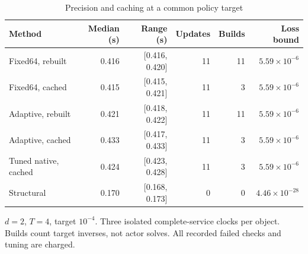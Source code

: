 \begin{table}[htbp]
\centering\small\setlength{\tabcolsep}{5pt}
\caption{Precision and caching at a common policy target}\label{tab:r39factorial}
\begin{tabular}{lrrrrr}
\toprule
Method & Median (s) & Range (s) & Updates & Builds & Loss bound\\
\midrule
Fixed64, rebuilt & 0.416 & [0.416, 0.420] & 11 & 11 & $5.59\times10^{-6}$\\
Fixed64, cached & 0.415 & [0.415, 0.421] & 11 & 3 & $5.59\times10^{-6}$\\
Adaptive, rebuilt & 0.421 & [0.418, 0.422] & 11 & 11 & $5.59\times10^{-6}$\\
Adaptive, cached & 0.433 & [0.417, 0.433] & 11 & 3 & $5.59\times10^{-6}$\\
Tuned native, cached & 0.424 & [0.423, 0.428] & 11 & 3 & $5.59\times10^{-6}$\\
Structural & 0.170 & [0.168, 0.173] & 0 & 0 & $4.46\times10^{-28}$\\
\bottomrule
\end{tabular}
\par\smallskip\begin{minipage}{.96\linewidth}\footnotesize $d=2$, $T=4$, target $10^{-4}$. Three isolated complete-service clocks per object. Builds count target inverses, not actor solves. All recorded failed checks and tuning are charged.\end{minipage}
\end{table}
